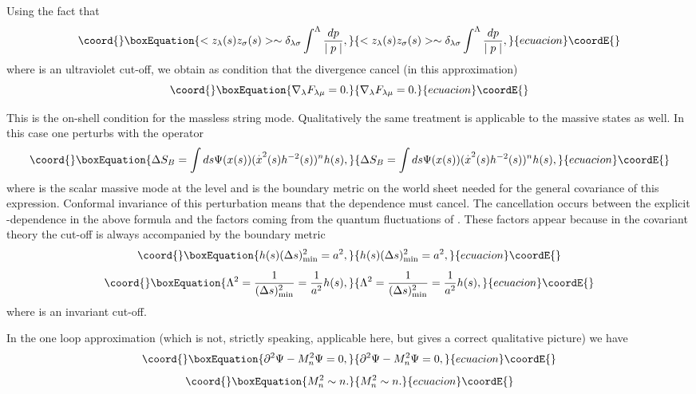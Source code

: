 \documentclass[a4paper,12pt]{article}
\begin{document}
Using the fact that 
\begin{equation}\coord{}\boxEquation{
<z_{\lambda }(s)z_{\sigma }(s)>\sim \delta _{\lambda \sigma }\int^{\Lambda }
\frac{dp}{\mid p\mid },
}{
<z_{\lambda }(s)z_{\sigma }(s)>\sim \delta _{\lambda \sigma }\int^{\Lambda }
\frac{dp}{\mid p\mid },
}{ecuacion}\coordE{}\end{equation}
where \myHighlight{$\Lambda $}\coordHE{} is an ultraviolet cut-off, we obtain as condition that the
divergence cancel (in this approximation) 
\begin{equation}\coord{}\boxEquation{
\nabla _{\lambda }F_{\lambda \mu }=0.
}{
\nabla _{\lambda }F_{\lambda \mu }=0.
}{ecuacion}\coordE{}\end{equation}

This is the on-shell condition for the massless string mode. Qualitatively
the same treatment is applicable to the massive states as well. In this case
one perturbs \coordHE{} with the operator 
\begin{equation}\coord{}\boxEquation{
\Delta S_{B}=\int ds\Psi (x(s))(\overset{.}{x}^{2}(s)h^{-2}(s))^{n}h(s),
}{
\Delta S_{B}=\int ds\Psi (x(s))(\overset{.}{x}^{2}(s)h^{-2}(s))^{n}h(s),
}{ecuacion}\coordE{}\end{equation}
where \myHighlight{$\Psi $}\coordHE{} is the scalar massive mode at the level \coordHE{} and \coordHE{} is the
boundary metric on the world sheet needed for the general covariance of this
expression. Conformal invariance of this perturbation means that the \coordHE{}
dependence must cancel. The cancellation occurs between the explicit \coordHE{}
-dependence in the above formula and the factors coming from the quantum
fluctuations of \coordHE{}. These factors appear because in the covariant theory
the cut-off is always accompanied by the boundary metric 
\begin{equation}\coord{}\boxEquation{
h(s)(\Delta s)_{\min }^{2}=a^{2},
}{
h(s)(\Delta s)_{\min }^{2}=a^{2},
}{ecuacion}\coordE{}\end{equation}
\begin{equation}\coord{}\boxEquation{
\Lambda ^{2}=\frac{1}{(\Delta s)_{\min }^{2}}=\frac{1}{a^{2}}h(s),
}{
\Lambda ^{2}=\frac{1}{(\Delta s)_{\min }^{2}}=\frac{1}{a^{2}}h(s),
}{ecuacion}\coordE{}\end{equation}
where \coordHE{} is an invariant cut-off.

In the one loop approximation (which is not, strictly speaking, applicable
here, but gives a correct qualitative picture) we have 
\begin{equation}\coord{}\boxEquation{
\partial ^{2}\Psi -M_{n}^{2}\Psi =0,
}{
\partial ^{2}\Psi -M_{n}^{2}\Psi =0,
}{ecuacion}\coordE{}\end{equation}
\begin{equation}\coord{}\boxEquation{
M_{n}^{2}\sim n.
}{
M_{n}^{2}\sim n.
}{ecuacion}\coordE{}\end{equation}
\end{document}
